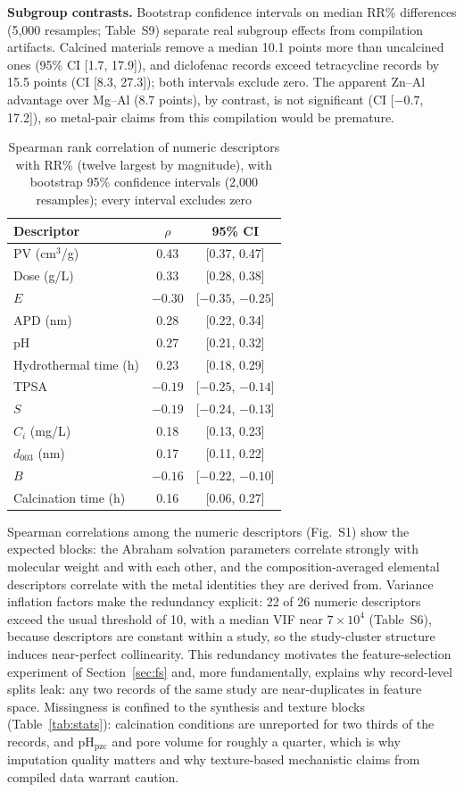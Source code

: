 \textbf{Subgroup contrasts.} Bootstrap confidence intervals on median
RR\% differences (5,000 resamples; Table~S9) separate real subgroup
effects from compilation artifacts. Calcined materials remove a median
10.1 points more than uncalcined ones (95\% CI [1.7, 17.9]), and
diclofenac records exceed tetracycline records by 15.5 points
(CI [8.3, 27.3]); both intervals exclude zero. The apparent Zn--Al
advantage over Mg--Al (8.7 points), by contrast, is not significant
(CI [$-0.7$, 17.2]), so metal-pair claims from this compilation would
be premature.

\begin{table}[t]
\centering
\caption{Spearman rank correlation of numeric descriptors with RR\%
(twelve largest by magnitude), with bootstrap 95\% confidence intervals
(2,000 resamples); every interval excludes zero}
\label{tab:spearman}
\begin{tabular}{lcc}
\toprule
Descriptor & $\rho$ & 95\% CI \\
\midrule
PV (cm$^3$/g) & 0.43 & [0.37, 0.47] \\
Dose (g/L) & 0.33 & [0.28, 0.38] \\
$E$ & $-0.30$ & [$-0.35$, $-0.25$] \\
APD (nm) & 0.28 & [0.22, 0.34] \\
pH & 0.27 & [0.21, 0.32] \\
Hydrothermal time (h) & 0.23 & [0.18, 0.29] \\
TPSA & $-0.19$ & [$-0.25$, $-0.14$] \\
$S$ & $-0.19$ & [$-0.24$, $-0.13$] \\
$C_i$ (mg/L) & 0.18 & [0.13, 0.23] \\
$d_{003}$ (nm) & 0.17 & [0.11, 0.22] \\
$B$ & $-0.16$ & [$-0.22$, $-0.10$] \\
Calcination time (h) & 0.16 & [0.06, 0.27] \\
\bottomrule
\end{tabular}
\end{table}

Spearman correlations among the numeric
descriptors (Fig.~S1) show the expected blocks: the Abraham solvation
parameters correlate strongly with molecular weight and with each other,
and the composition-averaged elemental descriptors correlate with the
metal identities they are derived from. Variance inflation factors make
the redundancy explicit: 22 of 26 numeric descriptors exceed the usual
threshold of 10, with a median VIF near $7 \times 10^{4}$ (Table~S6),
because descriptors are constant within a study, so the study-cluster
structure induces near-perfect collinearity. This redundancy motivates
the feature-selection experiment of Section~\ref{sec:fs} and, more
fundamentally, explains why record-level splits leak: any two records of
the same study are near-duplicates in feature space. Missingness is confined to the
synthesis and texture blocks (Table~\ref{tab:stats}): calcination
conditions are unreported for two thirds of the records, and
pH$_{\mathrm{pzc}}$ and pore volume for roughly a quarter, which is why
imputation quality matters and why texture-based mechanistic claims from
compiled data warrant caution.

